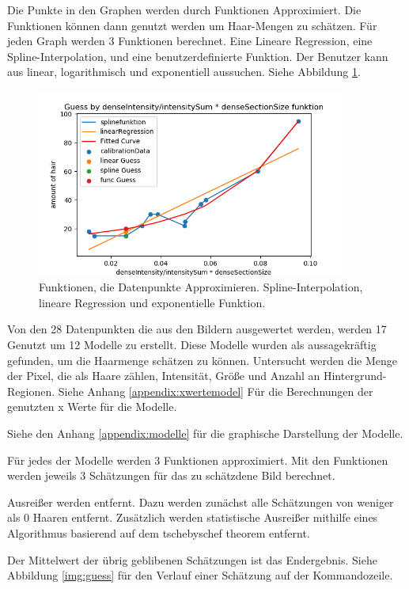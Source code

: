 \documentclass[german,a4paper, 12pt]{scrartcl}
\begin{document}
Die Punkte in den Graphen werden durch Funktionen Approximiert. Die Funktionen können dann genutzt werden um Haar-Mengen zu schätzen.
Für jeden Graph werden 3 Funktionen berechnet. Eine Lineare Regression, eine Spline-Interpolation, und eine benutzerdefinierte Funktion.
Der Benutzer kann aus linear, logarithmisch und exponentiell aussuchen.
Siehe Abbildung \ref{fig:func}.

\begin{figure}
	\centering
	\includegraphics[width=0.9\textwidth]{fig64/g11_denseIntensitynormDetailed.png}
	\caption[]{Funktionen, die Datenpunkte Approximieren. Spline-Interpolation, lineare Regression und exponentielle Funktion.}
	\label{fig:func}
\end{figure} 

Von den 28 Datenpunkten die aus den Bildern ausgewertet werden, werden 17 Genutzt um 12 Modelle zu erstellt. Diese Modelle wurden als aussagekräftig gefunden, um die Haarmenge schätzen zu können. Untersucht werden die Menge der Pixel, die als Haare zählen, Intensität, Größe und Anzahl an Hintergrund-Regionen. Siehe Anhang \ref{appendix:xwertemodel} Für die Berechnungen der genutzten x Werte für die Modelle. 

Siehe den Anhang \ref{appendix:modelle} für die graphische Darstellung der Modelle.

Für jedes der Modelle werden 3 Funktionen approximiert. Mit den Funktionen werden jeweils 3 Schätzungen für das zu schätzdene Bild berechnet. 

Ausreißer werden entfernt. Dazu werden zunächst alle Schätzungen von weniger als 0 Haaren entfernt. Zusätzlich werden statistische Ausreißer mithilfe eines Algorithmus basierend auf dem tschebyschef theorem entfernt. 

Der Mittelwert der übrig geblibenen Schätzungen ist das Endergebnis. 
Siehe Abbildung \ref{img:guess} für den Verlauf einer Schätzung auf der Kommandozeile.
\end{document}
